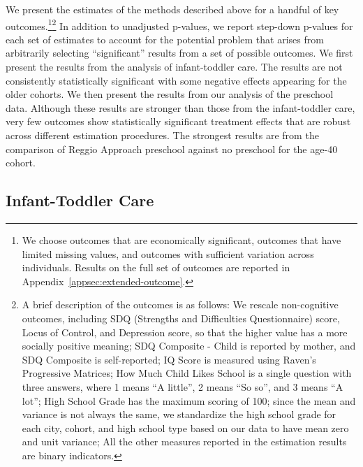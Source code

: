 We present the estimates of the methods described above for a handful of key outcomes.\footnote{We choose outcomes that are economically significant,  outcomes that have limited missing values, and outcomes with sufficient variation across individuals. Results on the full set of outcomes are reported in Appendix~\ref{appsec:extended-outcome}.}\footnote{A brief description of the outcomes is as follows: We rescale non-cognitive outcomes, including SDQ (Strengths and Difficulties Questionnaire) score, Locus of Control, and Depression score, so that the higher value has a more socially positive meaning; SDQ Composite - Child is reported by mother, and SDQ Composite is self-reported; IQ Score is measured using Raven's Progressive Matrices; How Much Child Likes School is a single question with three answers, where 1 means ``A little'', 2 means ``So so'', and 3 means ``A lot''; High School Grade has the maximum scoring of 100; since the mean and variance is not always the same, we standardize the high school grade for each city, cohort, and high school type based on our data to have mean zero and unit variance; All the other measures reported in the estimation results are binary indicators.} In addition to unadjusted p-values, we report step-down p-values for each set of estimates to account for the potential problem that arises from arbitrarily selecting ``significant'' results from a set of possible outcomes. We first present the results from the analysis of infant-toddler care. The results are not consistently statistically significant with some negative effects appearing for the older cohorts. We then present the results from our analysis of the preschool data. Although these results are stronger than those from the infant-toddler care, very few outcomes show statistically significant treatment effects that are robust across different estimation procedures. The strongest results are from the comparison of Reggio Approach preschool against no preschool for the age-40 cohort.

\subsection{Infant-Toddler Care}

